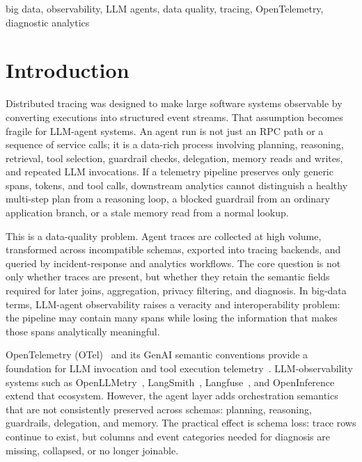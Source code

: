 \documentclass[conference]{IEEEtran}
\begin{document}
\begin{IEEEkeywords}
big data, observability, LLM agents, data quality, tracing,
OpenTelemetry, diagnostic analytics
\end{IEEEkeywords}

\section{Introduction}
\label{sec:introduction}

Distributed tracing was designed to make large software systems
observable by converting executions into structured event streams. That
assumption becomes fragile for LLM-agent systems. An agent run is not
just an RPC path or a sequence of service calls; it is a data-rich
process involving planning, reasoning, retrieval, tool selection,
guardrail checks, delegation, memory reads and writes, and repeated LLM
invocations. If a telemetry pipeline preserves only generic spans,
tokens, and tool calls, downstream analytics cannot distinguish a
healthy multi-step plan from a reasoning loop, a blocked guardrail from
an ordinary application branch, or a stale memory read from a normal
lookup.

This is a data-quality problem. Agent traces are collected at high
volume, transformed across incompatible schemas, exported into tracing
backends, and queried by incident-response and analytics workflows. The
core question is not only whether traces are present, but whether they
retain the semantic fields required for later joins, aggregation,
privacy filtering, and diagnosis. In big-data terms, LLM-agent
observability raises a veracity and interoperability problem: the
pipeline may contain many spans while losing the information that makes
those spans analytically meaningful.

OpenTelemetry (OTel)~\cite{otel_spec} and its GenAI semantic conventions
provide a foundation for LLM invocation and tool execution
telemetry~\cite{otel_genai}. LLM-observability systems such as
OpenLLMetry~\cite{openllmetry}, LangSmith~\cite{langsmith},
Langfuse~\cite{langfuse}, and OpenInference~\cite{openinference} extend
that ecosystem. However, the agent layer adds orchestration semantics
that are not consistently preserved across schemas: planning, reasoning,
guardrails, delegation, and memory. The practical effect is schema loss:
trace rows continue to exist, but columns and event categories needed
for diagnosis are missing, collapsed, or no longer joinable.
\end{document}
